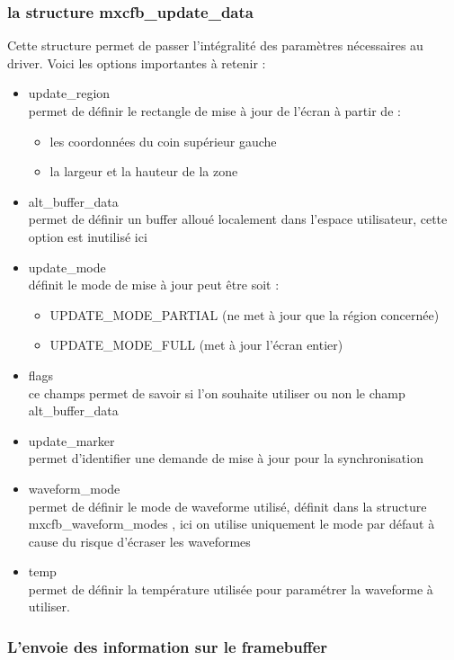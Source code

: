 \subsubsection{la structure mxcfb_update_data}
Cette structure permet de passer l'intégralité des paramètres nécessaires au driver.
Voici les options importantes à retenir : 
\begin{itemize}
	\renewcommand{\labelitemi}{$\bullet$}
	\item update_region \\
		permet de définir le rectangle de mise à jour de l'écran à partir de :
		\begin{itemize}
			\item les coordonnées du coin supérieur gauche
			\item la largeur et la hauteur de la zone
		\end{itemize}
	\item alt_buffer_data\\
		permet de définir un buffer alloué localement dans l'espace utilisateur, 
		cette option est inutilisé ici
		
	\item update_mode \\
		définit le mode de mise à jour peut être soit :
		\begin{itemize}
			\item UPDATE_MODE_PARTIAL (ne met à jour que la région concernée)
			\item UPDATE_MODE_FULL (met à jour l'écran entier)
		\end{itemize}
	\item flags\\
		ce champs permet de savoir si l'on souhaite utiliser ou non le champ alt_buffer_data
	\item update_marker\\
		permet d'identifier une demande de mise à jour pour la synchronisation
	\item waveform_mode \\
		permet de définir le mode de waveforme utilisé, définit dans la structure
		mxcfb_waveform_modes , ici on utilise uniquement le mode par défaut à cause du risque 
		d'écraser les waveformes
	\item temp\\
		permet de définir la température utilisée pour paramétrer la waveforme à utiliser.
	
\end{itemize}

\subsubsection{L'envoie des information sur le framebuffer}

